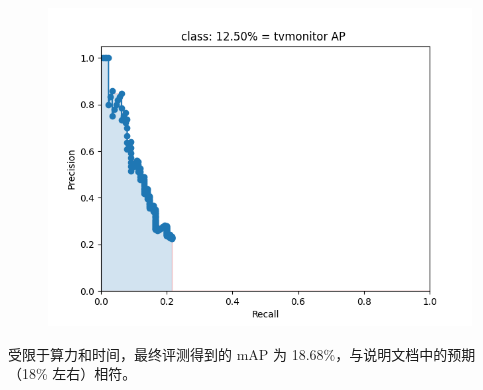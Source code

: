 \documentclass{article}%
\begin{document}
\begin{figure}[H]
\begin{minipage}{0.24\linewidth}
	\end{minipage}
    \begin{minipage}{0.24\linewidth}
		\centering
		\includegraphics[width=0.9\linewidth]{fast_rcnn/mAP_output/classes/tvmonitor.png}
	\end{minipage}
\end{figure}

受限于算力和时间，最终评测得到的 mAP 为 18.68\%，与说明文档中的预期（18\% 左右）相符。
\end{document}
